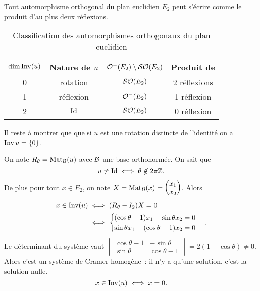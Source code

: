 \begin{theo}
  Tout automorphisme orthogonal du plan euclidien \(E_2\) peut s'écrire comme le produit d'au plus deux réflexions.
  \begin{table}[!h]
    \centering
    \begin{tabular}{|c|c|c|c|}\hline
      \(\operatorname{dim}\operatorname{Inv}(u)\) & Nature de \(u\) & \(\mathcal{O}^{-}\!\left(E_2\right)\setminus\mathcal{SO}\!\left(E_2\right)\)& Produit de \\ \hline
      0 & rotation & \(\mathcal{SO}\!\left(E_2\right)\) & 2 réflexions \\
      1 & réflexion & \(\mathcal{O}^{-}\!\left(E_2\right)\) & 1 réflexion \\
      2 & \(\operatorname{Id}\) & \(\mathcal{SO}\!\left(E_2\right)\) & 0 réflexion \\ \hline
    \end{tabular}
    \caption{Classification des automorphismes orthogonaux du plan euclidien}
    \label{tab:ClassOrth}
  \end{table}
\end{theo}

Il reste à montrer que  que si \(u\) est une rotation distincte de l'identité on a \(\operatorname{Inv} u =\{0\}\). 

On note \(R_\theta=\mathrm{Mat}_{\mathcal{B}}(u)\) avec \(\mathcal{B}\) une base orthonormée. On sait que
\begin{equation}
  u \neq \operatorname{Id} \iff \theta \not\in 2\pi\mathbb{Z}.
\end{equation}
De plus pour tout \(x \in E_2\), on note \(X=\mathrm{Mat}_{\mathcal{B}}(x)=\begin{pmatrix} x_1 \\ x_2 \end{pmatrix}\). Alors
\begin{align}
  x \in \operatorname{Inv}(u) &\iff (R_\theta-I_2)X=0 \\
                &\iff \begin{cases} (\cos\theta -1)x_1 -\sin\theta x_2 = 0 \\ \sin\theta x_1 +(\cos\theta -1)x_2=0 \end{cases}.
\end{align}
Le déterminant du système vaut \(\begin{vmatrix} \cos\theta -1 & -\sin\theta \\ \sin\theta & \cos\theta -1\end{vmatrix} = 2(1-\cos\theta)\neq 0\). Alors c'est un système de Cramer homogène~: il n'y a qu'une solution, c'est la solution nulle.
\begin{equation}
  x \in \operatorname{Inv}(u) \iff x=0.
\end{equation}

